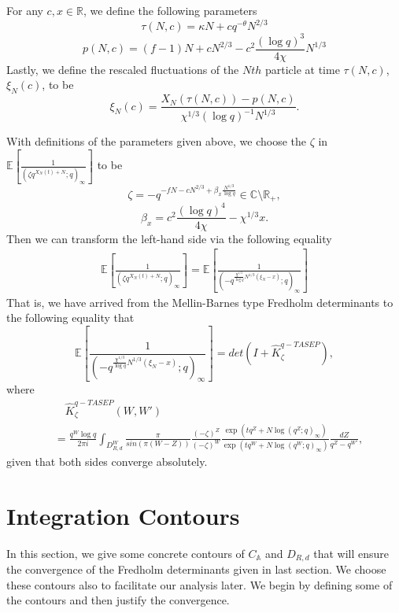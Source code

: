 \begin{definition}
For any $c,x \in \mathbb{R}$, we define the following parameters
\begin{equation*}
\tau(N,c) = \kappa N + cq^{-\theta}N^{2/3}
\end{equation*}
\begin{equation*}
p(N,c) = (f-1)N + cN^{2/3} - c^2 \frac{(\log q)^3}{4 \chi} N^{1/3}
\end{equation*}
Lastly, we define the rescaled fluctuations of the $Nth$ particle at time $\tau(N,c)$, $\xi_N(c)$, to be $$\xi_N(c) = \frac{X_N(\tau(N,c)) - p(N,c)}{\chi^{1/3} (\log q)^{-1} N^{1/3}}.$$
\end{definition}

With definitions of the parameters given above, we choose the $\zeta$ in $\mathbb{E} \left[ \frac{1}{(\zeta q^{X_N(t)+N}; q)_{\infty}} \right]$ to be 
\begin{equation}
\label{zeta-choice}
\zeta = -q^{-fN - cN^{2/3} + \beta_x \frac{N^{1/3}}{\log q}} \in \mathbb{C} \setminus \mathbb{R}_+,
\end{equation}
\begin{equation*}
\beta_x = c^2 \frac{(\log q)^4}{4 \chi} - \chi^{1/3} x.
\end{equation*}
Then we can transform the left-hand side via the following equality
\begin{align*}
\mathbb{E} \left[ \frac{1}{(\zeta q^{X_N(t)+N}; q)_{\infty}} \right] = \mathbb{E} \left[ \frac{1}{( -q^{ \frac{\chi^{1/3}}{\log q} N^{1/3} (\xi_N - x) }; q )_{\infty}} \right]
\end{align*}
That is, we have arrived from the Mellin-Barnes type Fredholm determinants to the following equality that 
\begin{equation}
\label{new-equality-mb-type}
\mathbb{E} \left[ \frac{1}{( -q^{ \frac{\chi^{1/3}}{\log q} N^{1/3} (\xi_N - x) }; q )_{\infty}} \right] = det(I+\hat{K}_{\zeta}^{q-TASEP}),
\end{equation}
where 
\begin{align*}
& \quad \hat{K}_{\zeta}^{q-TASEP}(W,W') \\
& = \frac{q^W \log q}{2 \pi i} \int_{D^W_{R,d}} \frac{\pi}{sin(\pi (W-Z))} \frac{(-\zeta)^Z}{(-\zeta)^W} \frac{\exp(tq^Z+N\log(q^Z;q)_{\infty})}{\exp(tq^W+N\log(q^W;q)_{\infty})} \frac{dZ}{q^Z - q^{W'}},
\end{align*}
given that both sides converge absolutely.

\section{Integration Contours}
\label{sec:integration-contours}
In this section, we give some concrete contours of $C_{\mathbb{A}}$ and $D_{R,d}$ that will ensure the convergence of the Fredholm determinants given in last section. We choose these contours also to facilitate our analysis later. We begin by defining some of the contours and then justify the convergence. 

